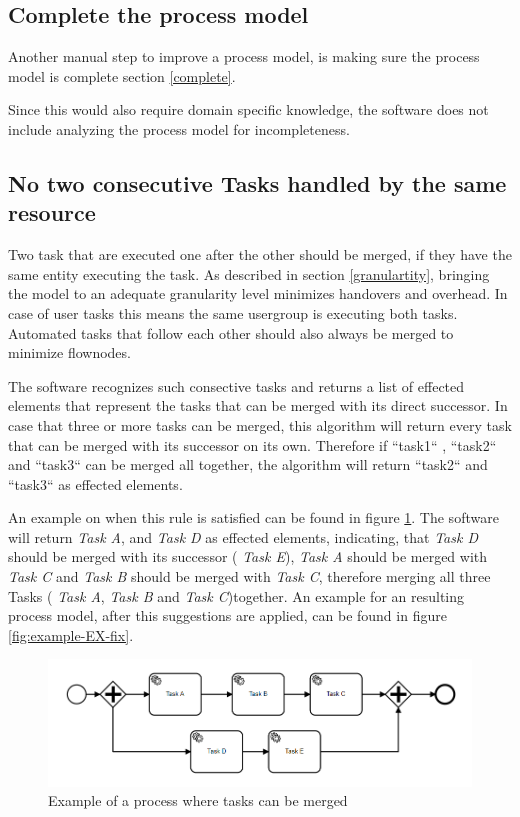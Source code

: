 \subsection{Complete the process model}
Another manual step to improve a process model, is making sure the process model is complete section \ref{complete}.

Since this would also require domain specific knowledge, the software does not include analyzing the process model for incompleteness.

\subsection{No two consecutive Tasks handled by the same resource}\label{merge-section}
Two task that are executed one after the other should be merged, if they have the same entity executing the task. As described in section \ref{granulartity}, bringing the model to an adequate granularity level minimizes handovers and overhead. In case of user tasks this means the same usergroup is executing both tasks. Automated tasks that follow each other should also always be merged to minimize flownodes.


The software recognizes such consective tasks and returns a list of effected elements that represent the tasks that can be merged with its direct successor. In case that three or more tasks can be merged, this algorithm will return every task that can be merged with its successor on its own. Therefore if ``task1`` , ``task2`` and ``task3`` can be merged all together, the algorithm will return ``task2`` and ``task3`` as effected elements.

An example on when this rule is satisfied can be found in figure \ref{fig:example-EX}. The software will return \textit{Task A},  and \textit{Task D} as effected elements, indicating, that  \textit{Task D} should be merged with its successor ( \textit{Task E}),  \textit{Task A} should be merged with  \textit{Task C} and  \textit{Task B} should be merged with  \textit{Task C}, therefore merging all three Tasks ( \textit{Task A}, \textit{Task B} and  \textit{Task C})together. An example for an resulting process model, after this suggestions are applied, can be found in figure \ref{fig:example-EX-fix}.

\begin{figure}[H]
	\centering
	\includegraphics[width=0.9\columnwidth]{graphics/merge-suggestion-1}
	\caption{Example of a process where tasks can be merged} 
	\label{fig:example-EX} 
\end{figure}


